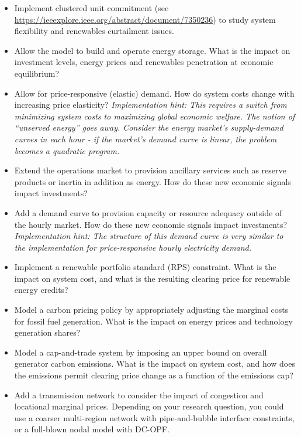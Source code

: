 \documentclass[11pt]{article}
\begin{document}
\begin{itemize}

\item Implement clustered unit commitment (see \url{https://ieeexplore.ieee.org/abstract/document/7350236}) to study system flexibility and renewables curtailment issues.

\item Allow the model to build and operate energy storage. What is the impact on investment levels, energy prices and renewables penetration at economic equilibrium?

\item Allow for price-responsive (elastic) demand. How do system costs change with increasing price elasticity? \textit{Implementation hint: This requires a switch from minimizing system costs to maximizing global economic welfare. The notion of ``unserved energy'' goes away. Consider the energy market's supply-demand curves in each hour - if the market's demand curve is linear, the problem becomes a quadratic program.}

\item Extend the operations market to provision ancillary services such as reserve products or inertia in addition as energy. How do these new economic signals impact investments?

\item Add a demand curve to provision capacity or resource adequacy outside of the hourly market. How do these new economic signals impact investments?
\textit{Implementation hint: The structure of this demand curve is very similar to the implementation for price-responsive hourly electricity demand.}

\item Implement a renewable portfolio standard (RPS) constraint. What is the impact on system cost, and what is the resulting clearing price for renewable energy credits? 

\item Model a carbon pricing policy by appropriately adjusting the marginal costs for fossil fuel generation. What is the impact on energy prices and technology generation shares?

\item Model a cap-and-trade system by imposing an upper bound on overall generator carbon emissions. What is the impact on system cost, and how does the emissions permit clearing price change as a function of the emissions cap?

\item Add a transmission network to consider the impact of congestion and locational marginal prices. Depending on your research question, you could use a coarser multi-region network with pipe-and-bubble interface constraints, or a full-blown nodal model with DC-OPF.


\end{itemize}
\end{document}
